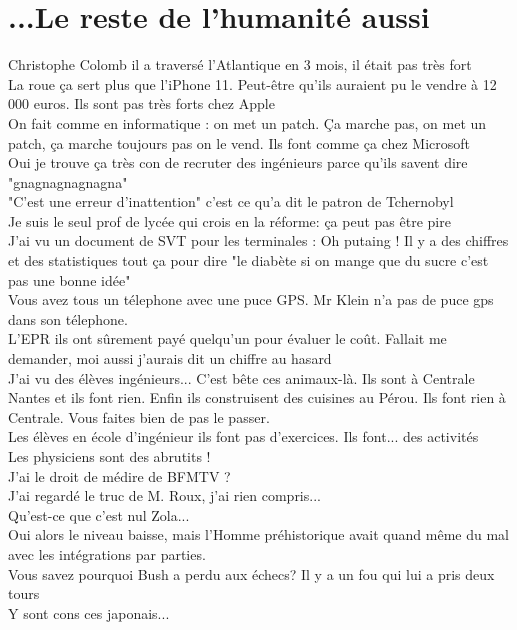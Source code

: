 \documentclass[french, a4paper, openany]{book}
\begin{document}
\section{...Le reste de l'humanité aussi}
 
	\noindent \og Christophe Colomb il a traversé l'Atlantique en 3 mois, il était pas très fort \fg \\
	\og La roue ça sert plus que l'iPhone 11. Peut-être qu'ils auraient pu le vendre à 12 000 euros. Ils sont pas très forts chez Apple \fg \\
	\og On fait comme en informatique : on met un patch. Ça marche pas, on met un patch, ça marche toujours pas on le vend. Ils font comme ça chez Microsoft \fg \\
	\og Oui je trouve ça très con de recruter des ingénieurs parce qu'ils savent dire "gnagnagnagnagna" \fg \\
	\og "C'est une erreur d'inattention" c'est ce qu'a dit le patron de Tchernobyl \fg \\
	\og Je suis le seul prof de lycée qui crois en la réforme: ça peut pas être pire \fg \\
	\og J'ai vu un document de SVT pour les terminales : Oh putaing ! Il y a des chiffres et des statistiques tout ça pour dire "le diabète si on mange que du sucre c'est pas une bonne idée" \fg \\
	\og Vous avez tous un télephone avec une puce GPS. Mr Klein n'a pas de puce gps dans son télephone. \fg \\
	\og L'EPR ils ont sûrement payé quelqu'un pour évaluer le coût. Fallait me demander, moi aussi j'aurais dit un chiffre au hasard \fg \\
	\og J'ai vu des élèves ingénieurs... C'est bête ces animaux-là. Ils sont à Centrale Nantes et ils font rien. Enfin ils construisent des cuisines au Pérou. Ils font rien à Centrale. Vous faites bien de pas le passer. \fg \\
	\og Les élèves en école d'ingénieur ils font pas d'exercices. Ils font... des activités \fg \\
	\og Les physiciens sont des abrutits ! \fg \\
	\og J'ai le droit de médire de BFMTV ? \fg \\
	\og J'ai regardé le truc de M. Roux, j'ai rien compris... \fg \\
	\og Qu'est-ce que c'est nul Zola... \fg \\
	\og Oui alors le niveau baisse, mais l'Homme préhistorique avait quand même du mal avec les intégrations par parties. \fg \\
	\og Vous savez pourquoi Bush a perdu aux échecs? Il y a un fou qui lui a pris deux tours \fg \\
	\og Y sont cons ces japonais... \fg \\
\end{document}
